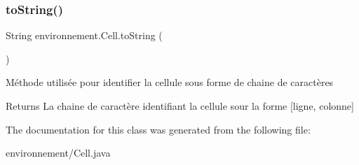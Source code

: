 \subsubsection{\texorpdfstring{to\+String()}{toString()}}
{\footnotesize\ttfamily String environnement.\+Cell.\+to\+String (\begin{DoxyParamCaption}{ }\end{DoxyParamCaption})}

Méthode utilisée pour identifier la cellule sous forme de chaine de caractères \begin{DoxyReturn}{Returns}
La chaine de caractère identifiant la cellule sour la forme \mbox{[}ligne, colonne\mbox{]} 
\end{DoxyReturn}


The documentation for this class was generated from the following file\+:\begin{DoxyCompactItemize}
\item 
environnement/Cell.\+java\end{DoxyCompactItemize}
